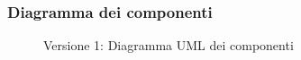 \subsubsection{Diagramma dei componenti}
\vspace{0.5cm}
\begin{figure}[H]
    \centering
    \caption{Versione 1: Diagramma UML dei componenti}
    \label{fig:components_v_1}
\end{figure}